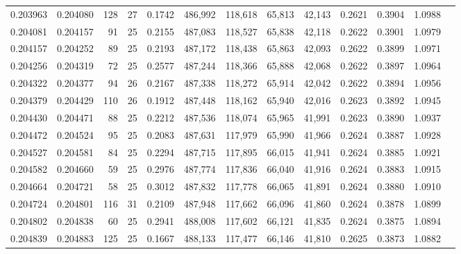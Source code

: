 \begin{tabular}{rrrrrrrrrrrrr}
0.203963 & 0.204080 & 128 &  27 &                                     0.1742 & 486,992 & 118,618 &  65,813 &  42,143 & 0.2621 & 0.3904 & 1.0988 \\
0.204081 & 0.204157 &  91 &  25 &                                     0.2155 & 487,083 & 118,527 &  65,838 &  42,118 & 0.2622 & 0.3901 & 1.0979 \\
0.204157 & 0.204252 &  89 &  25 &                                     0.2193 & 487,172 & 118,438 &  65,863 &  42,093 & 0.2622 & 0.3899 & 1.0971 \\
0.204256 & 0.204319 &  72 &  25 &                                     0.2577 & 487,244 & 118,366 &  65,888 &  42,068 & 0.2622 & 0.3897 & 1.0964 \\
0.204322 & 0.204377 &  94 &  26 &                                     0.2167 & 487,338 & 118,272 &  65,914 &  42,042 & 0.2622 & 0.3894 & 1.0956 \\
0.204379 & 0.204429 & 110 &  26 &                                     0.1912 & 487,448 & 118,162 &  65,940 &  42,016 & 0.2623 & 0.3892 & 1.0945 \\
0.204430 & 0.204471 &  88 &  25 &                                     0.2212 & 487,536 & 118,074 &  65,965 &  41,991 & 0.2623 & 0.3890 & 1.0937 \\
0.204472 & 0.204524 &  95 &  25 &                                     0.2083 & 487,631 & 117,979 &  65,990 &  41,966 & 0.2624 & 0.3887 & 1.0928 \\
0.204527 & 0.204581 &  84 &  25 &                                     0.2294 & 487,715 & 117,895 &  66,015 &  41,941 & 0.2624 & 0.3885 & 1.0921 \\
0.204582 & 0.204660 &  59 &  25 &                                     0.2976 & 487,774 & 117,836 &  66,040 &  41,916 & 0.2624 & 0.3883 & 1.0915 \\
0.204664 & 0.204721 &  58 &  25 &                                     0.3012 & 487,832 & 117,778 &  66,065 &  41,891 & 0.2624 & 0.3880 & 1.0910 \\
0.204724 & 0.204801 & 116 &  31 &                                     0.2109 & 487,948 & 117,662 &  66,096 &  41,860 & 0.2624 & 0.3878 & 1.0899 \\
0.204802 & 0.204838 &  60 &  25 &                                     0.2941 & 488,008 & 117,602 &  66,121 &  41,835 & 0.2624 & 0.3875 & 1.0894 \\
0.204839 & 0.204883 & 125 &  25 &                                     0.1667 & 488,133 & 117,477 &  66,146 &  41,810 & 0.2625 & 0.3873 & 1.0882 \\

\end{tabular}
